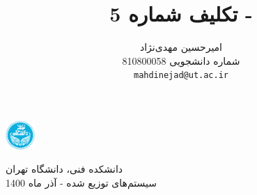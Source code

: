 \documentclass{article}
\title{تکلیف شماره 5
 - 
 \lr{Consensus}}
\author{%
  امیرحسین مهدی‌نژاد\\
  شماره دانشجویی 810800058\\
  \texttt{mahdinejad@ut.ac.ir} \\
}
\begin{document}
\begin{minipage}{0.1\textwidth}%
\includegraphics[width=1.1cm]{Photos/UT_logo.png}
\end{minipage}%
\hfill%
\begin{minipage}{0.9\textwidth}\raggedleft
دانشکده فنی، دانشگاه تهران\\
سیستم‌های توزیع شده - 
آذر
ماه 1400\\
\end{minipage}

\makepertitle

\end{document}
